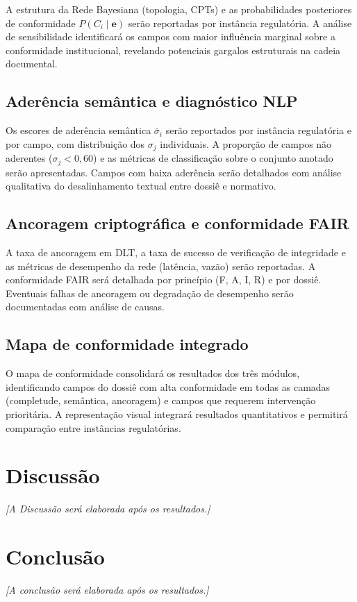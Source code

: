 A estrutura da Rede Bayesiana (topologia, CPTs) e as probabilidades posteriores de conformidade $P(C_i \mid \mathbf{e})$ serão reportadas por instância regulatória. A análise de sensibilidade identificará os campos com maior influência marginal sobre a conformidade institucional, revelando potenciais gargalos estruturais na cadeia documental.

\subsection{Aderência semântica e diagnóstico NLP}
\label{subsec:res_sbert_cap5}

Os escores de aderência semântica $\bar{\sigma}_i$ serão reportados por instância regulatória e por campo, com distribuição dos $\sigma_j$ individuais. A proporção de campos não aderentes ($\sigma_j < 0{,}60$) e as métricas de classificação sobre o conjunto anotado serão apresentadas. Campos com baixa aderência serão detalhados com análise qualitativa do desalinhamento textual entre dossiê e normativo.

\subsection{Ancoragem criptográfica e conformidade FAIR}
\label{subsec:res_dlt_cap5}

A taxa de ancoragem em DLT, a taxa de sucesso de verificação de integridade e as métricas de desempenho da rede (latência, vazão) serão reportadas. A conformidade FAIR será detalhada por princípio (F, A, I, R) e por dossiê. Eventuais falhas de ancoragem ou degradação de desempenho serão documentadas com análise de causas.

\subsection{Mapa de conformidade integrado}
\label{subsec:res_map_cap5}

O mapa de conformidade consolidará os resultados dos três módulos, identificando campos do dossiê com alta conformidade em todas as camadas (completude, semântica, ancoragem) e campos que requerem intervenção prioritária. A representação visual integrará resultados quantitativos e permitirá comparação entre instâncias regulatórias.


\section{Discussão}

\textit{[A Discussão será elaborada após os resultados.]}


\section{Conclusão}

\textit{[A conclusão será elaborada após os resultados.]}
